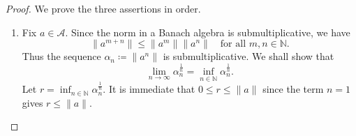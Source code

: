 \begin{proof}
We prove the three assertions in order.
    \begin{enumerate}
        \item Fix \(a \in \mathcal{A} \). Since the norm in a Banach algebra is submultiplicative, we have 
        \[
            \lVert a^{m + n} \rVert \le \lVert a^m \rVert \lVert a^n \rVert \quad \text{for all } m, n \in \mathbb{N}.    
        \]
        Thus the sequence \(\alpha _n \coloneqq \lVert a^n \rVert \) is submultiplicative. We shall show that 
        \[
            \lim_{n \to \infty} \alpha _n^{\frac{1}{n}} = \inf _{n \in \mathbb{N}} \alpha _n^{\frac{1}{n}}. 
        \] 
        Let \(r = \inf _{n \in \mathbb{N} } \alpha _n^{\frac{1}{n}}\). It is immediate that \(0 \le r \le \lVert a \rVert \) since the term \(n = 1\) gives \(r \le \lVert a \rVert \).


\end{enumerate}
\end{proof}
